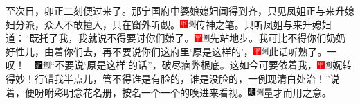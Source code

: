 至次日，卯正二刻便过来了。那宁国府中婆娘媳妇闻得到齐，只见凤姐正与来升媳妇分派，众人不敢擅入，只在窗外听觑。{\includegraphics[width=3mm]{../Images/00002}\includegraphics[width=3mm]{../Images/00011}\footnotesize \kaishu 传神之笔。}只听凤姐与来升媳妇道：“既托了我，我就说不得要讨你们嫌了。{\includegraphics[width=3mm]{../Images/00002}\includegraphics[width=3mm]{../Images/00011}\footnotesize \kaishu 先站地步。}我可比不得你们奶奶好性儿，由着你们去，再不要说你们这府里‘原是这样的’，{{\includegraphics[width=3mm]{../Images/00002}\includegraphics[width=3mm]{../Images/00011}\footnotesize \kaishu 此话听熟了。一叹！　}\includegraphics[width=3mm]{../Images/00006}\includegraphics[width=3mm]{../Images/00011}\footnotesize \kaishu “不要说‘原是这样’的话”，破尽痼弊根底。}这如今可要依着我，{\includegraphics[width=3mm]{../Images/00002}\includegraphics[width=3mm]{../Images/00011}\footnotesize \kaishu 婉转得妙！}行错我半点儿，管不得谁是有脸的，谁是没脸的，一例现清白处治！”说着，便吩咐彩明念花名册，按名一个一个的唤进来看视。{\includegraphics[width=3mm]{../Images/00004}\includegraphics[width=3mm]{../Images/00011}\footnotesize \kaishu 量才而用之意。}


